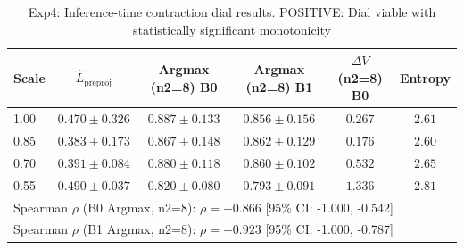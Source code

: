 \begin{table}[t]
\centering
\caption{Exp4: Inference-time contraction dial results. POSITIVE: Dial viable with statistically significant monotonicity}
\label{tab:exp4-dial}
\begin{tabular}{lccccc}
\toprule
Scale & $\hat{L}_{\text{preproj}}$ & Argmax (n2=8) B0 & Argmax (n2=8) B1 & $\Delta V$ (n2=8) B0 & Entropy \\
\midrule
1.00 & $0.470 \pm 0.326$ & $0.887 \pm 0.133$ & $0.856 \pm 0.156$ & $0.267$ & $2.61$ \\
0.85 & $0.383 \pm 0.173$ & $0.867 \pm 0.148$ & $0.862 \pm 0.129$ & $0.176$ & $2.60$ \\
0.70 & $0.391 \pm 0.084$ & $0.880 \pm 0.118$ & $0.860 \pm 0.102$ & $0.532$ & $2.65$ \\
0.55 & $0.490 \pm 0.037$ & $0.820 \pm 0.080$ & $0.793 \pm 0.091$ & $1.336$ & $2.81$ \\
\midrule
\multicolumn{6}{l}{\small Spearman $\rho$ (B0 Argmax, n2=8): $\rho=-0.866$ [95\% CI: -1.000, -0.542]} \\
\multicolumn{6}{l}{\small Spearman $\rho$ (B1 Argmax, n2=8): $\rho=-0.923$ [95\% CI: -1.000, -0.787]} \\
\bottomrule
\end{tabular}
\end{table}
